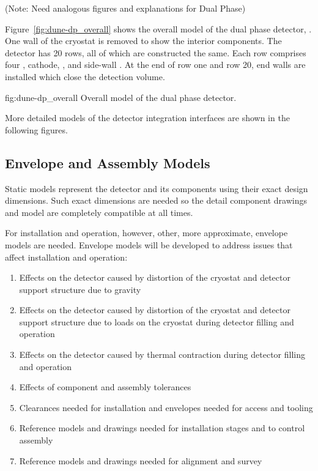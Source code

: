 (Note: Need analogous figures and explanations for Dual Phase)


Figure~\ref{fig:dune-dp_overall} shows the overall model of the dual
phase detector, . One wall of the cryostat is removed to show
the interior components. The detector has 20
rows, all of which are constructed the same. Each row comprises four
, cathode, ,  and side-wall . 
At the
end of row one and row 20, end walls are installed which close the
detection volume.
\begin{dunefigure}{fig:dune-dp_overall}
  {Overall model of the dual phase detector.}
\end{dunefigure}


More detailed models of the  detector integration
interfaces are shown in the following figures.


\subsection{Envelope and Assembly Models}
\label{sec:fdsp-coord-integ-envelope}

Static models represent the detector and its components using their exact
design dimensions. Such exact dimensions are needed so the
detail component drawings and model are completely compatible at all
times.


For installation and operation, however, other, more approximate, envelope models are needed. Envelope models will be developed
to address issues that affect installation and operation:
\begin{enumerate}
 \item Effects on the detector caused by distortion of the cryostat
   and detector support structure due to gravity
 \item Effects on the detector caused by distortion of the cryostat
   and detector support structure due to loads on the cryostat during detector filling and operation
 \item Effects on the detector caused by thermal contraction during
   detector filling and operation
 \item Effects of component and
   assembly tolerances
 \item Clearances needed for installation and envelopes needed for
   access and tooling
 \item Reference models and drawings needed for installation stages
   and to control assembly
 \item Reference models and drawings needed for alignment and survey
\end{enumerate}


